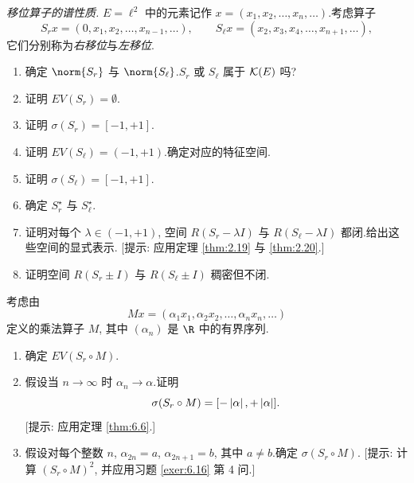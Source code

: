 \begin{exercise}
\label{exer:6.18}
\emph{移位算子的谱性质.}
$E=\ell^2$ 中的元素记作 $x=(x_1,x_2,\dots,x_n,\dots)$.考虑算子
\begin{equation*}
S_rx=(0,x_1,x_2,\dots,x_{n-1},\dots),\qquad
S_\ell x=(x_2,x_3,x_4,\dots,x_{n+1},\dots),
\end{equation*}
它们分别称为\emph{右移位}与\emph{左移位}.
\begin{enumerate}[label=\arabic*., leftmargin=2.2em, itemsep=0.3em]
	\item 确定 $\norm{S_r}$ 与 $\norm{S_\ell}$.$S_r$ 或 $S_\ell$ 属于
	      $\mathcal{K}(E)$ 吗?
	\item 证明 $EV(S_r)=\emptyset$.
	\item 证明 $\sigma(S_r)=[-1,+1]$.
	\item 证明 $EV(S_\ell)=(-1,+1)$.确定对应的特征空间.
	\item 证明 $\sigma(S_\ell)=[-1,+1]$.
	\item 确定 $S_r^\star$ 与 $S_\ell^\star$.
	\item 证明对每个 $\lambda\in(-1,+1)$, 空间 $R(S_r-\lambda I)$ 与
	      $R(S_\ell-\lambda I)$ 都闭.给出这些空间的显式表示.
	      [提示: 应用定理  \ref{thm:2.19} 与  \ref{thm:2.20}.]
	\item 证明空间 $R(S_r\pm I)$ 与 $R(S_\ell\pm I)$ 稠密但不闭.
\end{enumerate}

考虑由
\begin{equation*}
Mx=(\alpha_1x_1,\alpha_2x_2,\dots,\alpha_nx_n,\dots)
\end{equation*}
定义的乘法算子 $M$, 其中 $(\alpha_n)$ 是 $\R$ 中的有界序列.

\begin{enumerate}[label=\arabic*., leftmargin=2.2em, start=9, itemsep=0.3em]
	\item 确定 $EV(S_r\circ M)$.
	\item 假设当 $n\to\infty$ 时 $\alpha_n\to\alpha$.证明
	      \begin{equation*}
	      \sigma(S_r\circ M)=[-\left|\alpha\right|,+\left|\alpha\right|].
	      \end{equation*}
	      [提示: 应用定理  \ref{thm:6.6}.]
	\item 假设对每个整数 $n$, $\alpha_{2n}=a$, $\alpha_{2n+1}=b$, 其中
	      $a\ne b$.确定 $\sigma(S_r\circ M)$.
	      [提示: 计算 $(S_r\circ M)^2$, 并应用习题  \ref{exer:6.16} 第 4 问.]
\end{enumerate}
\end{exercise}


